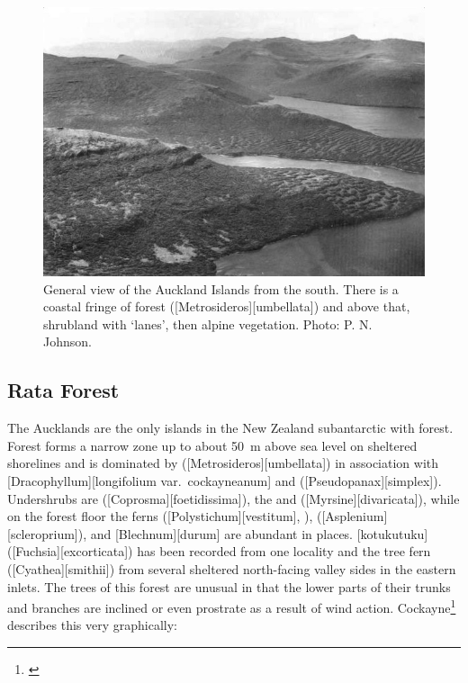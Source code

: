 \begin{figure}[!b]
	\includegraphics[width=\textwidth]{graphics/fig_116}
	\centering
	\caption[General view of the Auckland Islands from the south]{General view of the Auckland Islands from the south.
	There is a coastal fringe of  forest ([Metrosideros][umbellata]) and above that, shrubland with `lanes', then alpine vegetation.
	Photo: P. N. Johnson.}%
	\label{fig:116auckland-islands}
\end{figure}

\subsection{Rata Forest}

The Aucklands are the only islands in the New Zealand subantarctic with forest.
Forest forms a narrow zone up to about \SI{50}{\metre} above sea level on sheltered shorelines and is dominated by  ([Metrosideros][umbellata]) in association with [Dracophyllum][longifolium var.\ cockayneanum] and  ([Pseudopanax][simplex]).
Undershrubs are  ([Coprosma][foetidissima]), the  and  ([Myrsine][divaricata]), while on the forest floor the ferns  ([Polystichum][vestitum], ),  ([Asplenium][scleroprium]), and [Blechnum][durum] are abundant in places.
[kotukutuku] ([Fuchsia][excorticata]) has been recorded from one locality and the tree fern  ([Cyathea][smithii]) from several sheltered north-facing valley sides in the eastern inlets.
The trees of this forest are unusual in that the lower parts of their trunks and branches are inclined or even prostrate as a result of wind action.
Cockayne\footnote{\cite{cockayne1909ecological}} describes this very graphically:

